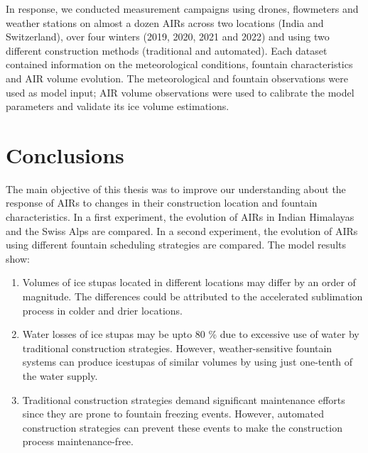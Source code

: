 In response, we conducted measurement campaigns using drones, flowmeters and weather stations on almost a dozen
AIRs across two locations (India and Switzerland), over four winters (2019, 2020, 2021 and 2022) and using two
different construction methods (traditional and automated). Each dataset contained information on the
meteorological conditions, fountain characteristics and AIR volume evolution. The meteorological and fountain
observations were used as model input; AIR volume observations were used to calibrate the model parameters and
validate its ice volume estimations.



\section{Conclusions}

The main objective of this thesis was to improve our understanding about the response of AIRs to changes in
their construction location and fountain characteristics. In a first experiment, the evolution of AIRs in Indian
Himalayas and the Swiss Alps are compared. In a second experiment, the evolution of AIRs using different
fountain scheduling strategies are compared. The model results show: 

\begin{enumerate} 

\item Volumes of ice stupas located in different locations may differ by an order of magnitude. The differences
  could be attributed to the accelerated sublimation process in colder and drier locations.

\item Water losses of ice stupas may be upto 80 \% due to excessive use of water by traditional construction
  strategies. However, weather-sensitive fountain systems can produce icestupas of similar volumes by using just
  one-tenth of the water supply.

\item Traditional construction strategies demand significant maintenance efforts since they are prone to
  fountain freezing events. However, automated construction strategies can prevent these events to make the
  construction process maintenance-free.

\end{enumerate}

